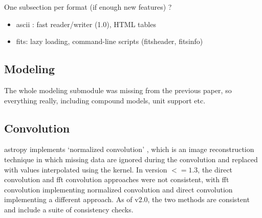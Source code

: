 \documentclass[modern]{aastex61}
\begin{document}
One subsection per format (if enough new features) ?

\begin{itemize}
\item ascii : fast reader/writer (1.0), HTML tables
\item fits: lazy loading, command-line scripts (fitsheader, fitsinfo)
\end{itemize}

\subsection{Modeling}
\label{sec:modeling}
The whole modeling submodule was missing from the previous paper, so everything really, including compound models, unit support etc.

\subsection{Convolution}

astropy implements `normalized convolution' \citep[e.g.,][]{Knutsson1993}, which is an image reconstruction technique in which missing data are ignored during the convolution and replaced with values interpolated using the kernel.   In version $<=1.3$, the direct convolution and fft convolution approaches were not consistent, with fft convolution implementing normalized convolution and direct convolution implementing a different approach.  As of v2.0, the two methods are consistent and include a suite of consistency checks.
\end{document}
